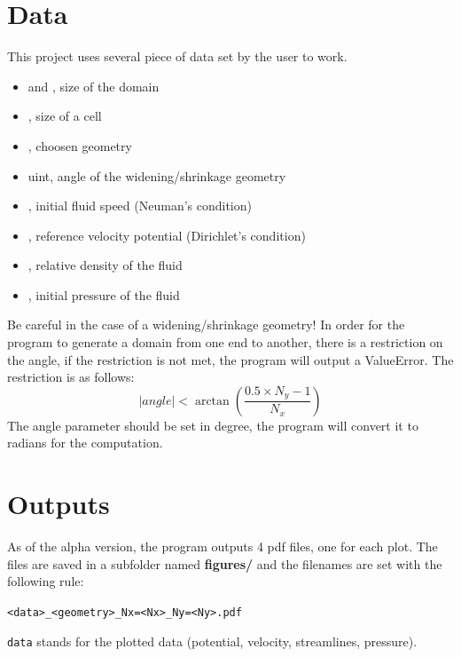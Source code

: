 \section{Data}
This project uses several piece of data set by the user to work.
\begin{itemize}
      \item {} \textcolor{dtype}{} and
             \textcolor{dtype}{}, size of the domain
      \item {} \textcolor{dtype}{}, size of a cell
      \item {}, choosen geometry
      \item {} \textcolor{dtype}{uint}, angle of the
            widening/shrinkage geometry
      \item {}, initial fluid speed (Neuman's condition)
      \item {}, reference velocity potential (Dirichlet's
            condition)
      \item {}, relative density of the fluid
      \item {}, initial pressure of the fluid
\end{itemize}
Be careful in the case of a widening/shrinkage geometry!
In order for the program to generate a domain from one end to another, there is
a restriction on the angle, if the restriction is not met, the program will
output a ValueError. The restriction is as follows:
\[
      |angle| < \arctan{\left(\dfrac{0.5 \times N_y - 1}{N_x}\right)}
\]
The angle parameter should be set in degree, the program will convert it to
radians for the computation.

\section{Outputs}
As of the alpha version, the program outputs 4 pdf files, one for each plot.
The files are saved in a subfolder named \textbf{figures/} and the filenames
are set with the following rule:\\
\begin{center}
      \texttt{<data>_<geometry>_Nx=<Nx>_Ny=<Ny>.pdf}
\end{center}
\texttt{data} stands for the plotted data (potential, velocity,
streamlines, pressure).
